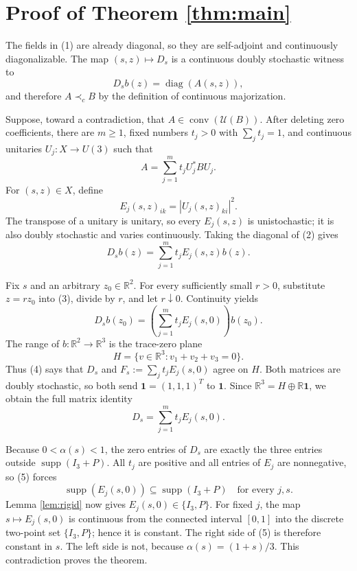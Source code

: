 \documentclass[11pt]{article}
\newcommand{\R}{\mathbb R}
\newcommand{\U}{\mathcal U}
\newcommand{\diag}{\operatorname{diag}}
\newcommand{\conv}{\operatorname{conv}}
\newcommand{\one}{\mathbf 1}
\begin{document}
\section{Proof of Theorem \ref{thm:main}}

The fields in (1) are already diagonal, so they are self-adjoint and
continuously diagonalizable.  The map $(s,z)\mapsto D_s$ is a continuous
doubly stochastic witness to
\[
                         D_sb(z)=\diag(A(s,z)),
\]
and therefore $A\prec_cB$ by the definition of continuous majorization.

Suppose, toward a contradiction, that $A\in\conv(\U(B))$.  After deleting
zero coefficients, there are $m\geq1$, fixed numbers $t_j>0$ with
$\sum_jt_j=1$, and continuous unitaries $U_j:X\to U(3)$ such that
\[
             A=\sum_{j=1}^m t_j U_j^*BU_j.                  \tag{2}
\]
For $(s,z)\in X$, define
\[
 E_j(s,z)_{ik}=\left|U_j(s,z)_{ki}\right|^2.
\]
The transpose of a unitary is unitary, so every $E_j(s,z)$ is
unistochastic; it is also doubly stochastic and varies continuously.
Taking the diagonal of (2) gives
\[
             D_sb(z)=\sum_{j=1}^m t_jE_j(s,z)b(z).          \tag{3}
\]

Fix $s$ and an arbitrary $z_0\in\R^2$.  For every sufficiently small
$r>0$, substitute $z=rz_0$ into (3), divide by $r$, and let $r\downarrow0$.
Continuity yields
\[
 D_sb(z_0)=\left(\sum_{j=1}^m t_jE_j(s,0)\right)b(z_0).     \tag{4}
\]
The range of $b:\R^2\to\R^3$ is the trace-zero plane
\[
             H=\{v\in\R^3:v_1+v_2+v_3=0\}.
\]
Thus (4) says that $D_s$ and
$F_s:=\sum_jt_jE_j(s,0)$ agree on $H$.  Both matrices are doubly
stochastic, so both send $\one=(1,1,1)^T$ to $\one$.  Since
$\R^3=H\oplus\R\one$, we obtain the full matrix identity
\[
                         D_s=\sum_{j=1}^m t_jE_j(s,0).       \tag{5}
\]

Because $0<\alpha(s)<1$, the zero entries of $D_s$ are exactly the three
entries outside $\operatorname{supp}(I_3+P)$.  All $t_j$ are positive and
all entries of $E_j$ are nonnegative, so (5) forces
\[
       \operatorname{supp}(E_j(s,0))
       \subseteq\operatorname{supp}(I_3+P)
       \quad\text{for every }j,s.
\]
Lemma \ref{lem:rigid} now gives $E_j(s,0)\in\{I_3,P\}$.  For fixed $j$,
the map $s\mapsto E_j(s,0)$ is continuous from the connected interval
$[0,1]$ into the discrete two-point set $\{I_3,P\}$; hence it is constant.
The right side of (5) is therefore constant in $s$.  The left side is not,
because $\alpha(s)=(1+s)/3$.  This contradiction proves the theorem.
\end{document}
